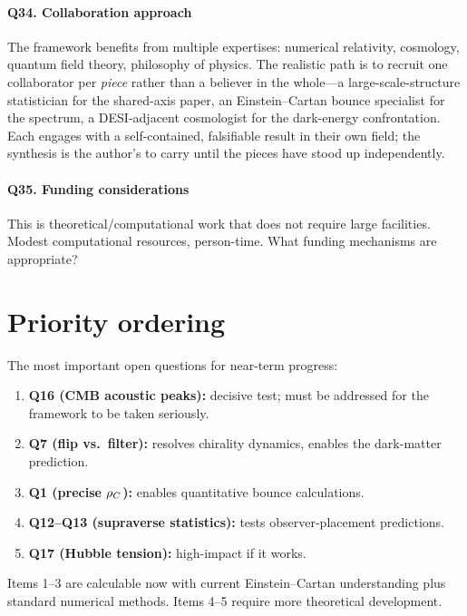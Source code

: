 \paragraph{Q34. Collaboration approach}
The framework benefits from multiple expertises: numerical relativity, cosmology,
quantum field theory, philosophy of physics. The realistic path is to recruit one
collaborator per \emph{piece} rather than a believer in the whole---a
large-scale-structure statistician for the shared-axis paper, an Einstein--Cartan
bounce specialist for the spectrum, a DESI-adjacent cosmologist for the dark-energy
confrontation. Each engages with a self-contained, falsifiable result in their own
field; the synthesis is the author's to carry until the pieces have stood up
independently.

\paragraph{Q35. Funding considerations}
This is theoretical/computational work that does not require large facilities.
Modest computational resources, person-time. What funding mechanisms are
appropriate?

\section{Priority ordering}

The most important open questions for near-term progress:

\begin{enumerate}
  \item \textbf{Q16 (CMB acoustic peaks):} decisive test; must be addressed for
    the framework to be taken seriously.
  \item \textbf{Q7 (flip vs.\ filter):} resolves chirality dynamics, enables the
    dark-matter prediction.
  \item \textbf{Q1 (precise $\rho_{C}$):} enables quantitative bounce calculations.
  \item \textbf{Q12--Q13 (supraverse statistics):} tests observer-placement
    predictions.
  \item \textbf{Q17 (Hubble tension):} high-impact if it works.
\end{enumerate}

Items 1--3 are calculable now with current Einstein--Cartan understanding plus
standard numerical methods. Items 4--5 require more theoretical development.
